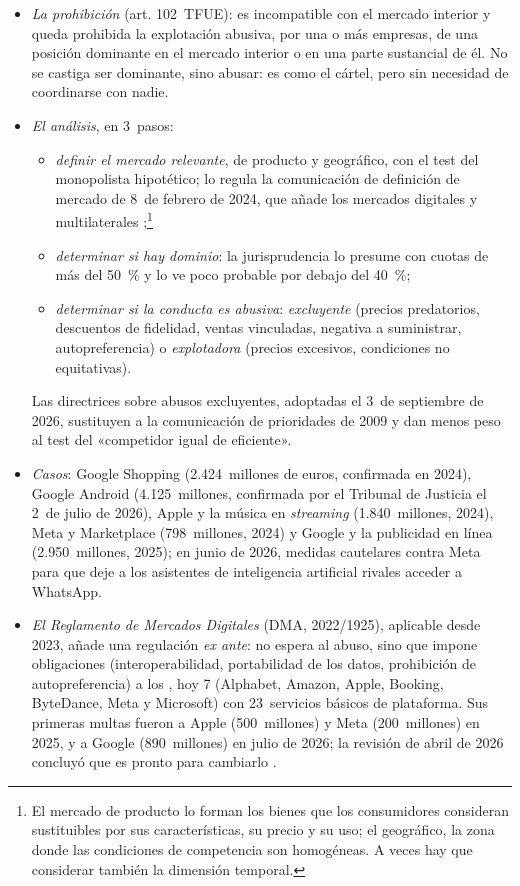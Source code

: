 \documentclass[11pt]{article}
\begin{document}
\begin{itemize}
\item \emph{La prohibición} (art. 102~TFUE): es incompatible con el mercado interior y queda prohibida la explotación abusiva, por una o más empresas, de una posición dominante en el mercado interior o en una parte sustancial de él. No se castiga ser dominante, sino abusar: es como el cártel, pero sin necesidad de coordinarse con nadie.
\item \emph{El análisis}, en 3~pasos:
  \begin{itemize}
  \item \emph{definir el mercado relevante}, de producto y geográfico, con el test del monopolista hipotético; lo regula la comunicación de definición de mercado de 8~de febrero de 2024, que añade los mercados digitales y multilaterales ;\footnote{El mercado de producto lo forman los bienes que los consumidores consideran sustituibles por sus características, su precio y su uso; el geográfico, la zona donde las condiciones de competencia son homogéneas. A veces hay que considerar también la dimensión temporal.}
  \item \emph{determinar si hay dominio}: la jurisprudencia lo presume con cuotas de más del 50~\% y lo ve poco probable por debajo del 40~\%;
  \item \emph{determinar si la conducta es abusiva}: \emph{excluyente} (precios predatorios, descuentos de fidelidad, ventas vinculadas, negativa a suministrar, autopreferencia) o \emph{explotadora} (precios excesivos, condiciones no equitativas).
  \end{itemize}
  Las directrices sobre abusos excluyentes, adoptadas el 3~de septiembre de 2026, sustituyen a la comunicación de prioridades de 2009 y dan menos peso al test del «competidor igual de eficiente»\nocite{CE2026Art102}.
\item \emph{Casos}: Google Shopping (2.424~millones de euros, confirmada en 2024), Google Android (4.125~millones, confirmada por el Tribunal de Justicia el 2~de julio de 2026), Apple y la música en \emph{streaming} (1.840~millones, 2024), Meta y Marketplace (798~millones, 2024) y Google y la publicidad en línea (2.950~millones, 2025); en junio de 2026, medidas cautelares contra Meta para que deje a los asistentes de inteligencia artificial rivales acceder a WhatsApp\nocite{TJUE2026GoogleAndroid,CE2026Hechos}.
\item \emph{El Reglamento de Mercados Digitales} (DMA, 2022/1925), aplicable desde 2023, añade una regulación \emph{ex ante}: no espera al abuso, sino que impone obligaciones (interoperabilidad, portabilidad de los datos, prohibición de autopreferencia) a los , hoy 7 (Alphabet, Amazon, Apple, Booking, ByteDance, Meta y Microsoft) con 23~servicios básicos de plataforma. Sus primeras multas fueron a Apple (500~millones) y Meta (200~millones) en 2025, y a Google (890~millones) en julio de 2026; la revisión de abril de 2026 concluyó que es pronto para cambiarlo\nocite{UE2022DMA,CE2026DMA} .
\end{itemize}
\end{document}
